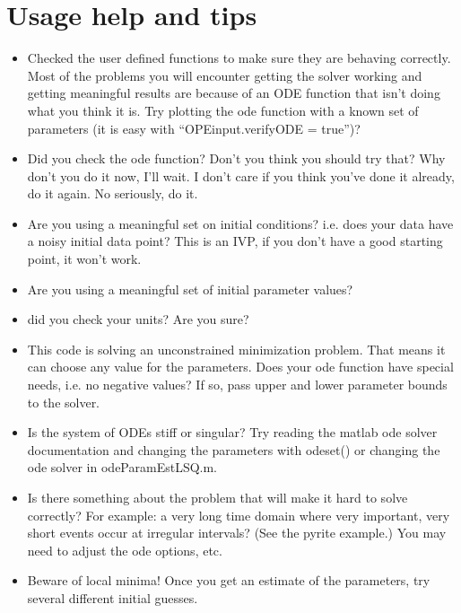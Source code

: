 \documentclass[10pt]{article}
\theoremstyle{plain}
\begin{document}
\section{Usage help and tips}
\begin{itemize}
\item 
Checked the user defined functions to make sure they are behaving
correctly. Most of the problems you will encounter getting the solver
working and getting meaningful results are because of an ODE function
that isn't doing what you think it is. Try plotting the ode function
with a known set of parameters (it is easy with ``OPEinput.verifyODE =
true'')? 

\item
Did you check the ode function? Don't you think you should try that?
Why don't you do it now, I'll wait. I don't care if you think you've
done it already, do it again. No seriously, do it.
  
\item Are you using a meaningful set on initial conditions?
i.e. does your data have a noisy initial data point? This is an IVP,
if you don't have a good starting point, it won't work.

\item Are you using a meaningful set of initial parameter values? 

\item did you check your units? Are you sure?

\item This code is solving an unconstrained minimization
problem. That means it can choose any value for the parameters. Does
your ode function have special needs, i.e. no negative values? If so,
pass upper and lower parameter bounds to the solver.

\item Is the system of ODEs stiff or singular? Try reading the matlab
ode solver documentation and changing the parameters with odeset() or
changing the ode solver in odeParamEstLSQ.m.

\item Is there something about the problem that will make it hard to 
solve correctly? For example: a very long time domain where very
important, very short events occur at irregular intervals? (See the
pyrite example.) You may need to adjust the ode options, etc.

\item Beware of local minima! Once you get an estimate of the parameters,
try several different initial guesses.

\end{itemize}
\end{document}

